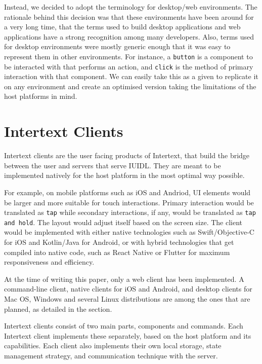 Instead, we decided to adopt the terminology for desktop/web environments. The rationale behind this decision was that these environments have been around for a very long time, that the terms used to build desktop applications and web applications have a strong recognition among many developers. Also, terms used for desktop environments were mostly generic enough that it was easy to represent them in other environments. For instance, a \texttt{button} is a component to be interacted with that performs an action, and \texttt{click} is the method of primary interaction with that component. We can easily take this as a given to replicate it on any environment and create an optimised version taking the limitations of the host platforms in mind.

\section{Intertext Clients} \label{intertextClients}

Intertext clients are the user facing products of Intertext, that build the bridge between the user and servers that serve IUIDL. They are meant to be implemented natively for the host platform in the most optimal way possible. 

For example, on mobile platforms such as iOS and Andriod, UI elements would be larger and more suitable for touch interactions. Primary interaction would be translated as \texttt{tap} while secondary interactions, if any, would be translated as \texttt{tap and hold}. The layout would adjust itself based on the screen size. The client would be implemented with either native technologies such as Swift/Objective-C for iOS and Kotlin/Java for Android, or with hybrid technologies that get compiled into native code, such as React Native or Flutter for maximum responsiveness and efficiency. 

At the time of writing this paper, only a web client has been implemented. A command-line client, native clients for iOS and Android, and desktop clients for Mac OS, Windows and several Linux distributions are among the ones that are planned, as detailed in the  section.

Intertext clients consist of two main parts, components and commands. Each Intertext client implements these separately, based on the host platform and its capabilities. Each client also implements their own local storage, state management strategy, and communication technique with the server.

